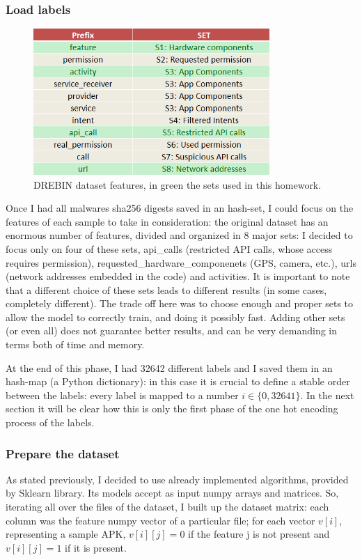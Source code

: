 \documentclass[12pt]{article}
\begin{document}
\subsubsection{Load labels}
\begin{figure}[!ht]
	\centering %
	\includegraphics[width=0.8\textwidth]{features.png} %
	\caption{DREBIN dataset features, in green the sets used in this homework.} 
	\label{fig:features}
\end{figure}
Once I had all malwares sha256 digests saved in an hash-set, I could focus on the features of each sample to take in consideration: the original dataset has an enormous number of features, divided and organized in 8 major sets: I decided to focus only on four of these sets, api\_calls (restricted API calls, whose access requires permission), requested\_hardware\_componenets (GPS, camera, etc.), urls (network addresses embedded in the code) and activities. It is important to note that a different choice of these sets leads to different results (in some cases, completely different). The trade off here was to choose enough and proper sets to allow the model to correctly train, and doing it possibly fast. Adding other sets (or even all) does not guarantee better results, and can be very demanding in terms both of time and memory.

At the end of this phase, I had 32642 different labels and I saved them in an hash-map (a Python dictionary): in this case it is crucial to define a stable order between the labels: every label is mapped to a number $i \in \{0, 32641\}$.
In the next section it will be clear how this is only the first phase of the one hot encoding process of the labels.

\subsubsection{Prepare the dataset}
As stated previously, I decided to use already implemented algorithms, provided by Sklearn library. Its models accept as input numpy arrays and matrices. So, iterating all over the files of the dataset, I built up the dataset matrix: each column was the feature numpy vector of a particular file; for each vector $v[i]$, representing a sample APK, $v[i][j] = 0$ if the feature j is not present and $v[i][j] = 1$ if it is present.
\end{document}
